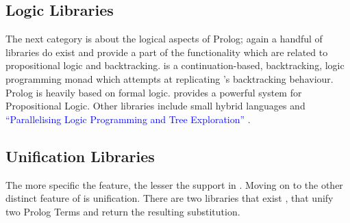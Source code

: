 \documentclass[thesis-solanki.tex]{subfiles}
\begin{document}
\begin{comment}
\begin{enumerate}
	\item Nano Prolog
	\item Prolog
	\item cspm-To-Prolog
	\item prolog-graph and prolog-graph-lib
	\item hswip,
	\\* \url{https://groups.google.com/forum/#!topic/haskell-cafe/3vmCuw7NlWE}
\end{enumerate}
\end{comment}

\subsection{Logic Libraries}

  The next category is about the logical aspects of Prolog; again a handful of libraries do exist and provide a
  part of the functionality which are related
  to propositional logic and backtracking.
  \cite{logict-lib} is a continuation-based, backtracking, logic programming monad which attempts at replicating
  's
  backtracking behaviour.
  Prolog is heavily based on formal logic.
  \cite{proplogic-lib} provides a powerful system for Propositional Logic.
  Other libraries
  include small hybrid languages \cite{cflp-lib} and
  \textcolor{blue}{``Parallelising Logic Programming and Tree Exploration''}
  \cite{logic-grows-on-trees-lib}.


\subsection{Unification Libraries}

The more specific the feature{\Large,} the lesser the support in .
Moving on to the other distinct feature of  is unification.
There are two libraries that exist \cite{unification-fd-lib},
\cite{cmu-lib} that unify two Prolog Terms and return the resulting substitution.
\end{document}
